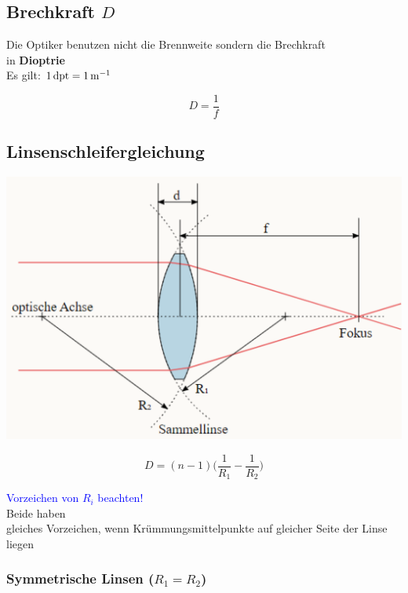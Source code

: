 \subsection{Brechkraft $D$}
Die Optiker benutzen nicht die Brennweite sondern die Brechkraft \\
in \textbf{Dioptrie}  \\
Es gilt: $1 \, \mathrm{dpt} = 1 \, \mathrm{m}^{-1}$

$$ \boxed{ D = \frac{1}{f} }$$




\subsection{Linsenschleifergleichung}

\begin{minipage}{0.52\linewidth}
\includegraphics[width=\linewidth]{Bilder/Wellen-Optik/Linsenschleifergleichung}
\end{minipage}
\hfill
\begin{minipage}{0.46\linewidth}
$$\boxed{D = (n-1)  \Big(  \frac{1}{R_1} - \frac{1}{R_2} \Big)  }$$

\textcolor{blue}{Vorzeichen von $R_i$ beachten!} \\
Beide haben \\
gleiches Vorzeichen, wenn Krümmungsmittelpunkte auf gleicher Seite der Linse liegen
\end{minipage}



\subsubsection{Symmetrische Linsen ($R_1 = R_2$)}


